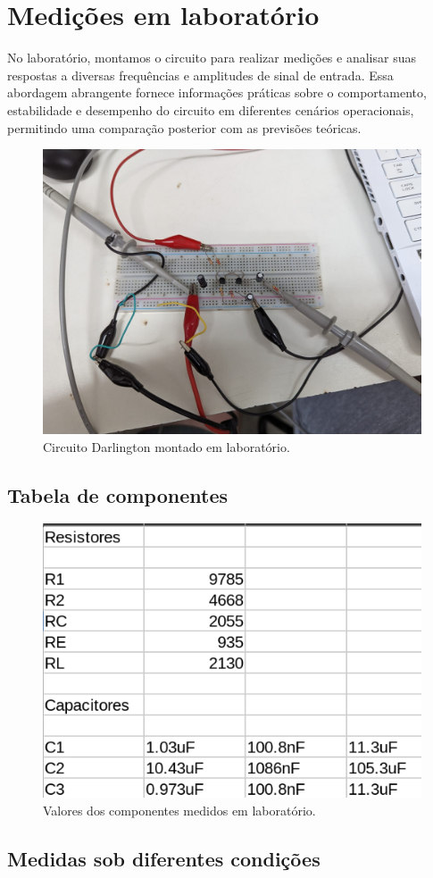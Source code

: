 \section{Medições em laboratório}

No laboratório, montamos o circuito para realizar medições e analisar suas respostas a diversas frequências e amplitudes de sinal de entrada. Essa abordagem abrangente fornece informações práticas sobre o comportamento, estabilidade e desempenho do circuito em diferentes cenários operacionais, permitindo uma comparação posterior com as previsões teóricas.

\begin{figure}[H]
    \centering
    \includegraphics[width=0.5\columnwidth]{Images/circuito_real.jpeg}
    \caption{Circuito Darlington montado em laboratório.}
\end{figure}

\subsection{Tabela de componentes}

\begin{figure}[H]
    \centering
    \includegraphics[width=0.5\columnwidth]{Images/componentes_reais.png}
    \caption{Valores dos componentes medidos em laboratório.}
\end{figure}

\subsection{Medidas sob diferentes condições}

